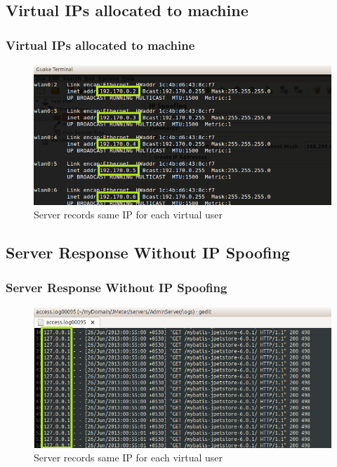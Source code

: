 \documentclass[12pt]{beamer}
\begin{document}
\subsection{Virtual IPs allocated to machine}
\begin{frame}[c]
\frametitle{Virtual IPs allocated to machine}
\begin{figure}
 \centering
 \includegraphics[width=12cm]{images/ips.png}
 \caption{Server records same IP for each virtual user}
\end{figure}
\end{frame}

\subsection{Server Response Without IP Spoofing}
\begin{frame}[c]
\frametitle{Server Response Without IP Spoofing}
\begin{figure}
 \centering
 \includegraphics[width=12cm]{images/sl2.png}
 \caption{Server records same IP for each virtual user}
\end{figure}
\end{frame}

\end{document}
